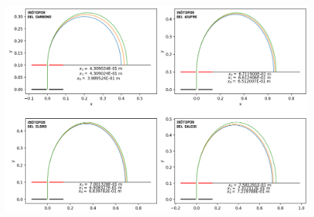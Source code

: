 \documentclass{article}
\begin{document}
    \begin{figure}[h]
        \hspace*{-0.6cm}
        \includegraphics[width=1\textwidth]{Fotos/isotopos.png}
        \hspace*{-2cm}
    \end{figure}

\hfill
\end{document}
